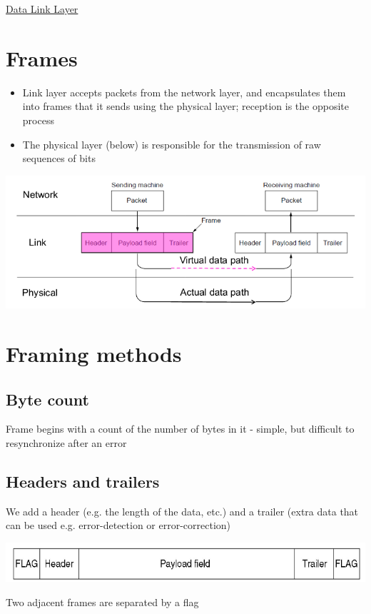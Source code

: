\documentclass{article}[18pt]
\begin{document}
\begin{center}
\underline{\huge Data Link Layer}
\end{center}
\section{Frames}
\begin{itemize}
	\item Link layer accepts packets from the network layer, and encapsulates them into frames that it sends using the physical layer; reception is the opposite process
	\item The physical layer (below) is responsible for the transmission of raw sequences of bits
\end{itemize}
\begin{center}
	\includegraphics[scale=0.7]{frame}
\end{center}
\section{Framing methods}
\subsection{Byte count}
Frame begins with a count of the number of bytes in it - simple, but difficult to resynchronize after an error
\subsection{Headers and trailers}
We add a header (e.g. the length of the data, etc.) and a trailer (extra data that can be used e.g. error-detection or error-correction)
\begin{center}
	\includegraphics[scale=0.7]{flag}
\end{center}
Two adjacent frames are separated by a flag
\end{document}
